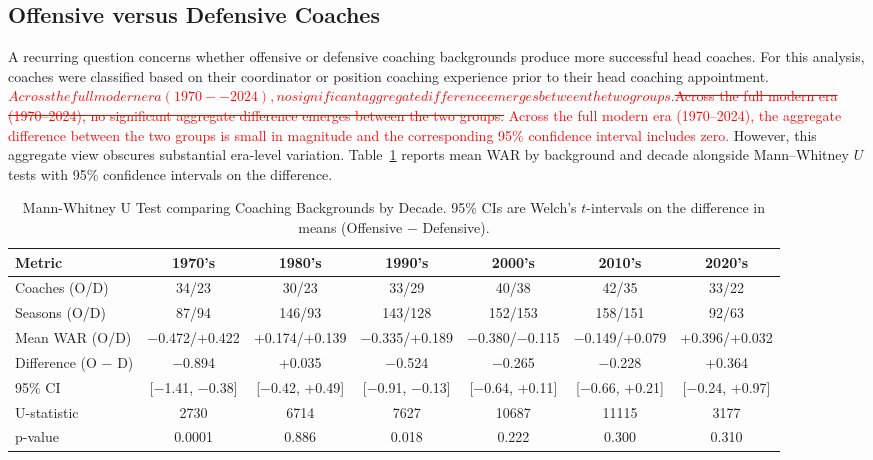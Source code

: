 \documentclass[USenglish]{article}
\newcommand{\rev}[1]{\textcolor{red}{#1}}
\newcommand{\del}[1]{\textcolor{red}{\ifmmode\mbox{\sout{\ensuremath{#1}}}\else\sout{#1}\fi}}
\theoremstyle{dgthm}
\theoremstyle{dgdef}
\begin{document}
\subsection{Offensive versus Defensive Coaches}

A recurring question concerns whether offensive or defensive coaching backgrounds produce more successful head coaches. For this analysis, coaches were classified based on their coordinator or position coaching experience prior to their head coaching appointment. \del{Across the full modern era (1970--2024), no significant aggregate difference emerges between the two groups.} \rev{Across the full modern era (1970--2024), the aggregate difference between the two groups is small in magnitude and the corresponding 95\% confidence interval includes zero.} However, this aggregate view obscures substantial era-level variation. Table~\ref{tab:background_decade_stats} reports mean WAR by background and decade alongside Mann--Whitney $U$ tests with 95\% confidence intervals on the difference.

\begin{table}[!ht]
\caption{Mann-Whitney U Test comparing Coaching Backgrounds by Decade. 95\% CIs are Welch's $t$-intervals on the difference in means (Offensive $-$ Defensive).}
\label{tab:background_decade_stats}
\tiny
\begin{tabular}{lcccccc}
\toprule
Metric & 1970's & 1980's & 1990's & 2000's & 2010's & 2020's \\
\midrule
Coaches (O/D) & 34/23 & 30/23 & 33/29 & 40/38 & 42/35 & 33/22 \\
Seasons (O/D) & 87/94 & 146/93 & 143/128 & 152/153 & 158/151 & 92/63 \\
Mean WAR (O/D) & $-$0.472/+0.422 & +0.174/+0.139 & $-$0.335/+0.189 & $-$0.380/$-$0.115 & $-$0.149/+0.079 & +0.396/+0.032 \\
Difference (O $-$ D) & $-$0.894 & +0.035 & $-$0.524 & $-$0.265 & $-$0.228 & +0.364 \\
95\% CI & [$-$1.41, $-$0.38] & [$-$0.42, +0.49] & [$-$0.91, $-$0.13] & [$-$0.64, +0.11] & [$-$0.66, +0.21] & [$-$0.24, +0.97] \\
U-statistic & 2730 & 6714 & 7627 & 10687 & 11115 & 3177 \\
p-value & 0.0001 & 0.886 & 0.018 & 0.222 & 0.300 & 0.310 \\
\bottomrule
\end{tabular}
\end{table}
\end{document}
